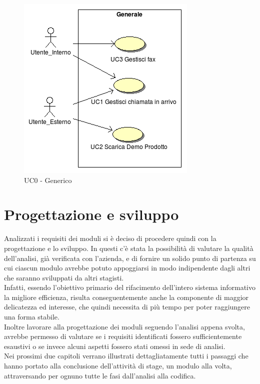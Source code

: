 \begin{figure}[!ht]
\centering
 \includegraphics[scale=0.8]{./images/UC0_Generale.png}
\caption{UC0 - Generico}
\label{UC0}
\end{figure}

\newpage
\section{Progettazione e sviluppo}
Analizzati i requisiti dei moduli si \`e deciso di procedere quindi con la progettazione e lo sviluppo. In questi c'\`e stata la possibilit\`a di valutare la qualit\`a dell'analisi, gi\`a verificata con l'azienda, e di fornire un solido punto di partenza su cui ciascun modulo avrebbe potuto appoggiarsi in modo indipendente dagli altri che saranno sviluppati da altri stagisti. \\
Infatti, essendo l'obiettivo primario del rifacimento dell'intero sistema informativo la migliore efficienza, risulta conseguentemente anche la componente di maggior delicatezza ed interesse, che quindi necessita di pi\`u tempo per poter raggiungere una forma stabile. \\
Inoltre lavorare alla progettazione dei moduli seguendo l'analisi appena svolta, avrebbe permesso di valutare se i requisiti identificati fossero sufficientemente esaustivi o se invece alcuni aspetti fossero stati omessi in sede di analisi. \\
Nei prossimi due capitoli verrano illustrati dettagliatamente tutti i passaggi che hanno portato alla conclusione dell'attivit\`a di stage, un modulo alla volta, attraversando per ognuno tutte le fasi dall'analisi alla codifica.





